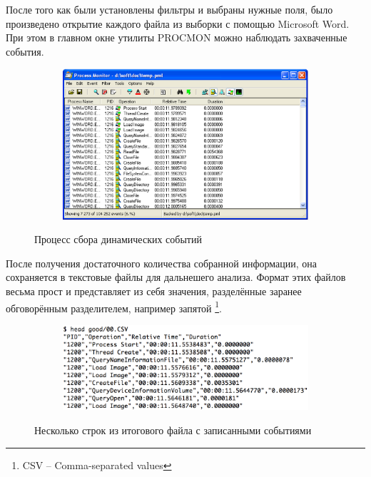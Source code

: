 После того как были установлены фильтры и выбраны нужные поля, было произведено открытие каждого файла из выборки с помощью Microsoft Word.
При этом в главном окне утилиты PROCMON можно наблюдать захваченные события.

\begin{figure}[ht]
	\centering
    \begin{subfigure}[b]{1\textwidth}
    \centering
        \includegraphics[scale=0.5]{procmon_events.png}        
    \end{subfigure}
 
    \caption{Процесс сбора динамических событий}
    \label{fig_parsetree}
\end{figure}

\newpage
После получения достаточного количества собранной информации, она сохраняется в текстовые файлы для дальнешего анализа.
Формат этих файлов весьма прост и представляет из себя значения, разделённые заранее обговорённым разделителем, например запятой \footnote{CSV -- Comma-separated values}.

\begin{figure}[ht]
	\centering
    \begin{subfigure}[b]{1\textwidth}
    \centering
        \includegraphics[scale=0.5]{csv.png}        
    \end{subfigure}
 
    \caption{Несколько строк из итогового файла с записанными событиями}
    \label{fig_parsetree}
\end{figure}

